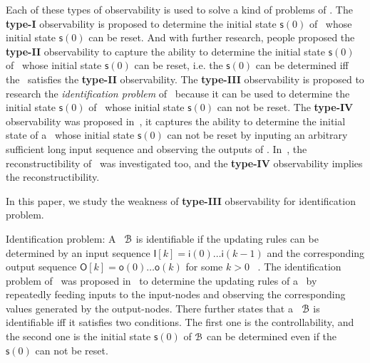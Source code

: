 Each of these types of observability is used to solve a kind of problems of \BCNs. The {\bf type-I}  observability is proposed to determine the initial state $\mathsf{s}(0)$ of \BCN\ whose initial state $\mathsf{s}(0)$ can be reset. %
And with further research, people proposed the {\bf type-II} observability to capture the ability to determine the initial state $\mathsf{s}(0)$ of \BCN\ whose initial state $\mathsf{s}(0)$ can be reset, i.e. the $\mathsf{s}(0)$ can be determined iff the \BCN\ satisfies the {\bf type-II} observability. The {\bf type-III} observability is proposed to research the {\em identification problem} of \BCN\ because it can be used to determine the initial state $\mathsf{s}(0)$ of \BCN\ whose initial state $\mathsf{s}(0)$ can not be reset. The {\bf type-IV} observability was proposed in~\cite{Fornasini2013Observability}, it captures the ability to determine the initial state of a \BCN\ whose initial state $\mathsf{s}(0)$ can not be reset by  inputing an arbitrary sufficient long input sequence and observing the outputs of \BCN. In~\cite{Fornasini2013Observability}, the reconstructibility of \BCNs\ was investigated too, and the {\bf type-IV} observability implies the reconstructibility. %

In this paper, we study the weakness of {\bf type-III} observability for identification problem.

Identification problem: A \BCN\ ${\mathcal{B}}$ is identifiable if the updating rules can be determined by an input sequence $\mathsf{I}[k]=\mathsf{i}(0)\ldots\mathsf{i}(k-1)$ and the corresponding output sequence $\mathsf{O}[k]=\mathsf{o}(0)\ldots\mathsf{o}(k)$ for some $k>0$~ \cite{Cheng2011Identification}. The identification problem of \BCNs\ was proposed in~\cite{Cheng2011Identification} to determine the updating rules of a \BCN\ by repeatedly feeding inputs to the input-nodes and observing the corresponding values generated by the output-nodes. 
There further states that a \BCN\ ${\mathcal{B}}$ is identifiable iff it satisfies two conditions. The first one is the controllability, and the second one is the initial state $\mathsf{s}(0)$ of ${\mathcal{B}}$ can be determined even if the $\mathsf{s}(0)$ can not be reset. %

